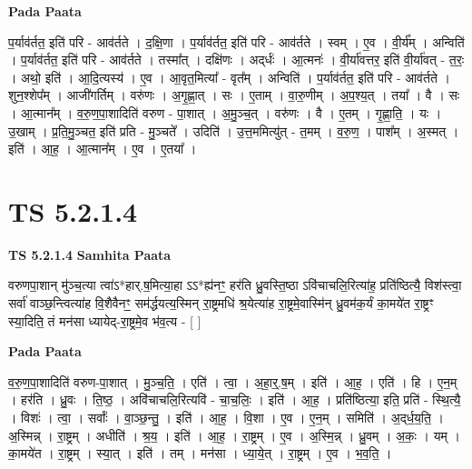 \documentclass[17pt]{extarticle}
\begin{document}
\textbf{Pada Paata} \newline

प॒र्याव॑र्तत॒ इति॑ परि - आव॑र्तते । द॒क्षि॒णा । प॒र्याव॑र्तत॒ इति॑ परि - आव॑र्तते । स्वम् । ए॒व । वी॒र्य᳚म् । अन्विति॑ । प॒र्याव॑र्तत॒ इति॑ परि - आव॑र्तते । तस्मा᳚त् । दक्षि॑णः । अद्‌र्धः॑ । आ॒त्मनः॑ । वी॒र्या॑वत्तर॒ इति॑ वी॒र्या॑वत् - त॒रः॒ । अथो॒ इति॑ । आ॒दि॒त्यस्य॑ । ए॒व । आ॒वृत॒मित्या᳚ - वृत᳚म् । अन्विति॑ । प॒र्याव॑र्तत॒ इति॑ परि - आव॑र्तते । शुन॒श्शेप᳚म् । आजी॑गर्तिम् । वरु॑णः । अ॒गृ॒ह्णा॒त् । सः । ए॒ताम् । वा॒रु॒णीम् । अ॒प॒श्य॒त् । तया᳚ । वै । सः । आ॒त्मान᳚म् । व॒रु॒ण॒पा॒शादिति॑ वरुण - पा॒शात् । अ॒मु॒ञ्च॒त् । वरु॑णः । वै । ए॒तम् । गृ॒ह्णा॒ति॒ । यः । उ॒खाम् । प्र॒ति॒मु॒ञ्चत॒ इति॑ प्रति - मु॒ञ्चते᳚ । उदिति॑ । उ॒त्त॒ममित्यु॑त् - त॒मम् । व॒रु॒ण॒ । पाश᳚म् । अ॒स्मत् । इति॑ । आ॒ह॒ । आ॒त्मान᳚म् । ए॒व । ए॒तया᳚ ।  \newline





\section{ TS 5.2.1.4 }

\textbf{TS 5.2.1.4 } \newline
\textbf{Samhita Paata} \newline

वरुणपा॒शान् मु॑ञ्च॒त्या त्वा॑ऽ*हार्.ष॒मित्या॒हा ऽऽ*ह्य॑नꣳ॒॒ हर॑ति ध्रु॒वस्ति॒ष्ठा ऽवि॑चाचलि॒रित्या॑ह॒ प्रति॑ष्ठित्यै॒ विश॑स्त्वा॒ सर्वा॑ वाञ्छ॒न्त्वित्या॑ह वि॒शैवैनꣳ॒॒ सम॑र्द्धयत्य॒स्मिन् रा॒ष्ट्रमधि॑ श्र॒येत्या॑ह रा॒ष्ट्रमे॒वास्मि॑न् ध्रु॒वम॑क॒र्यं का॒मये॑त रा॒ष्ट्रꣳ स्या॒दिति॒ तं मन॑सा ध्यायेद्-रा॒ष्ट्रमे॒व भ॑व॒त्य - [  ] \newline

\textbf{Pada Paata} \newline

व॒रु॒ण॒पा॒शादिति॑ वरुण-पा॒शात् । मु॒ञ्च॒ति॒ । एति॑ । त्वा॒ । अ॒हा॒र्॒.ष॒म् । इति॑ । आ॒ह॒ । एति॑ । हि । ए॒न॒म् । हर॑ति । ध्रु॒वः । ति॒ष्ठ॒ । अवि॑चाचलि॒रित्यवि॑ - चा॒च॒लिः॒ । इति॑ । आ॒ह॒ । प्रति॑ष्ठित्या॒ इति॒ प्रति॑ - स्थि॒त्यै॒ । विशः॑ । त्वा॒ । सर्वाः᳚ । वा॒ञ्छ॒न्तु॒ । इति॑ । आ॒ह॒ । वि॒शा । ए॒व । ए॒न॒म् । समिति॑ । अ॒द्‌र्ध॒य॒ति॒ । अ॒स्मिन्न् । रा॒ष्ट्रम् । अधीति॑ । श्र॒य॒ । इति॑ । आ॒ह॒ । रा॒ष्ट्रम् । ए॒व । अ॒स्मि॒न्न् । ध्रु॒वम् । अ॒कः॒ । यम् । का॒मये॑त । रा॒ष्ट्रम् । स्या॒त् । इति॑ । तम् । मन॑सा । ध्या॒ये॒त् । रा॒ष्ट्रम् । ए॒व । भ॒व॒ति॒ ।  \newline
\end{document}
